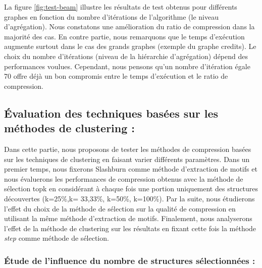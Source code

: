 	  La figure \ref{fig:test-beam} illustre les résultats de test obtenus pour différents graphes en fonction du nombre d'itérations de l'algorithme (le niveau d'agrégation). Nous constatons une amélioration du ratio de compression dans la majorité des cas. En contre partie, nous remarquons que le temps d'exécution  augmente surtout dans le cas des grands graphes (exemple du graphe credits). Le choix du nombre d'itérations (niveau de la hiérarchie d'agrégation) dépend des performances voulues. Cependant, nous pensons qu'un  nombre d'itération égale 70 offre déjà un bon compromis entre le temps d'exécution et le ratio de compression.
	
	\subsection{Évaluation des techniques basées sur les méthodes de clustering :}
	
	Dans cette partie, nous proposons de tester les méthodes de compression basées sur les techniques de clustering en faisant varier différents paramètres. Dans un premier temps, nous fixerons  Slashburn comme méthode d'extraction de motifs et nous évaluerons les performances de compression obtenus avec la méthode de sélection topk en considérant à chaque fois une portion uniquement des structures découvertes (k=25\%,k= 33,33\%, k=50\%, k=100\%). Par la suite, nous étudierons l'effet  du choix de la méthode de sélection sur la qualité de compression en  utilisant la même méthode d'extraction de motifs. Finalement, nous analyserons l'effet de la méthode de clustering sur les résultats en fixant cette fois la méthode \textit{step} comme méthode de sélection.
	
	
		
		\subsubsection{Étude de l'influence du nombre de structures sélectionnées :}
	
